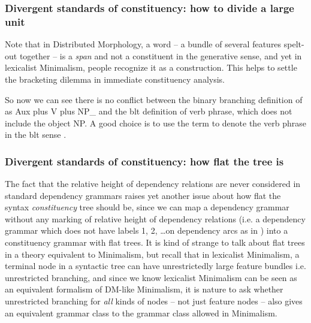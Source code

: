 \documentclass[../main.tex]{subfiles}
\begin{document}
\subsubsection{Divergent standards of constituency: how to divide a large unit}\label{sec:divergent-standard-constituency-segmentation}

Note that in Distributed Morphology, a word -- a bundle of several features spelt-out together -- 
is a \emph{span} and not a constituent in the generative sense, 
and yet in lexicalist Minimalism, people recognize it as a construction. 
This helps to settle the bracketing dilemma in immediate constituency analysis.

So now we can see there is no conflict 
between the binary branching definition of  as Aux plus V plus NP_{} 
and the \ac{blt} definition of verb phrase, which does not include the object NP. 
A good choice is to use the term  to denote the verb phrase in the \ac{blt} sense \citep[among others]{Wilbur2014,Friesen2017}.

\subsubsection{Divergent standards of constituency: how flat the tree is}

The fact that the relative height of dependency relations are never considered 
in standard dependency grammars raises yet another issue about 
how flat the syntax \emph{constituency} tree should be,
since we can map a dependency grammar without any marking of relative height of dependency relations 
(i.e. a dependency grammar which does not have labels 1, 2, \dots on dependency arcs as in )
into a constituency grammar with flat trees. 
It is kind of strange to talk about flat trees in a theory equivalent to Minimalism, 
but recall that in lexicalist Minimalism, 
a terminal node in a syntactic tree can have unrestrictedly large feature bundles i.e. unrestricted branching, 
and since we know lexicalist Minimalism can be seen as an equivalent formalism of DM-like Minimalism, 
it is nature to ask whether unrestricted branching for \emph{all} kinds of nodes 
-- not just feature nodes -- also gives an equivalent grammar class to the grammar class allowed in Minimalism.
\end{document}
